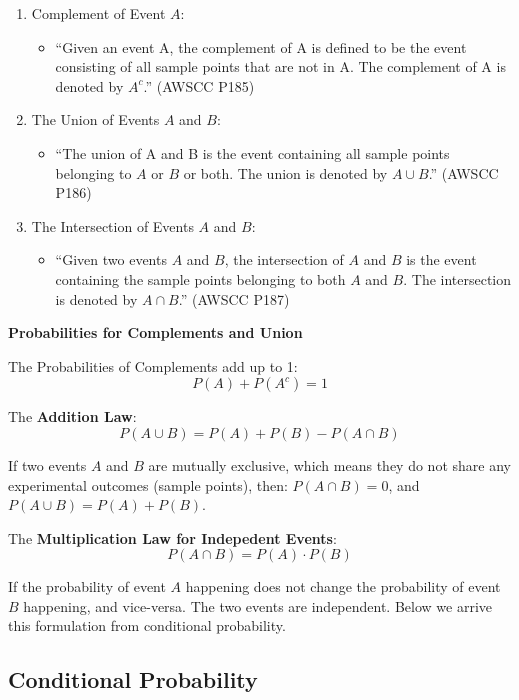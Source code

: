 \documentclass[
]{book}
\providecommand{\tightlist}{%
  \setlength{\itemsep}{0pt}\setlength{\parskip}{0pt}}
\begin{document}
\begin{enumerate}
\def\labelenumi{\arabic{enumi}.}
\tightlist
\item
  Complement of Event \(A\):

  \begin{itemize}
  \tightlist
  \item
    ``Given an event A, the complement of A is defined to be the event consisting of all sample points that are not in A. The complement of A is denoted by \(A^c\).'' (AWSCC P185)
  \end{itemize}
\item
  The Union of Events \(A\) and \(B\):

  \begin{itemize}
  \tightlist
  \item
    ``The union of A and B is the event containing all sample points belonging to \(A\) or \(B\) or both. The union is denoted by \(A \cup B\).'' (AWSCC P186)
  \end{itemize}
\item
  The Intersection of Events \(A\) and \(B\):

  \begin{itemize}
  \tightlist
  \item
    ``Given two events \(A\) and \(B\), the intersection of \(A\) and \(B\) is the event containing the sample points belonging to both \(A\) and \(B\). The intersection is denoted by \(A \cap B\).'' (AWSCC P187)
  \end{itemize}
\end{enumerate}

\textbf{Probabilities for Complements and Union}

The Probabilities of Complements add up to 1:
\[P(A) + P(A^c) = 1\]

The \textbf{Addition Law}:
\[P (A \cup B) = P(A) + P(B) - P (A \cap B)\]

If two events \(A\) and \(B\) are mutually exclusive, which means they do not share any experimental outcomes (sample points), then: \(P (A \cap B) = 0\), and \(P (A \cup B) = P(A) + P(B)\).

The \textbf{Multiplication Law for Indepedent Events}:
\[P (A \cap B) = P(A) \cdot P(B)\]

If the probability of event \(A\) happening does not change the probability of event \(B\) happening, and vice-versa. The two events are independent. Below we arrive this formulation from conditional probability.

\hypertarget{conditional-probability}{%
\subsection{Conditional Probability}\label{conditional-probability}}
\end{document}
